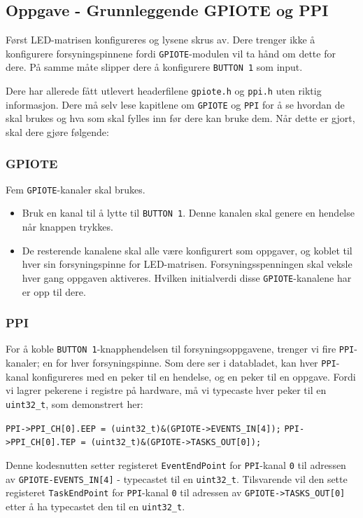 \subsection{Oppgave - Grunnleggende GPIOTE og PPI}
Først LED-matrisen konfigureres og lysene skrus av. Dere trenger ikke å konfigurere forsyningspinnene fordi \verb|GPIOTE|-modulen vil ta hånd om dette for dere. På samme måte slipper dere å konfigurere \verb|BUTTON 1| som input.

Dere har allerede fått utlevert headerfilene \verb|gpiote.h| og \verb|ppi.h| uten riktig informasjon. Dere må selv lese kapitlene om \verb|GPIOTE| og \verb|PPI| for å se hvordan de skal brukes og hva som skal fylles inn før dere kan bruke dem. Når dette er gjort, skal dere gjøre følgende:

\subsubsection{GPIOTE}

Fem \verb|GPIOTE|-kanaler skal brukes. 

\begin{itemize}
    \item Bruk en kanal til å lytte til \verb|BUTTON 1|. Denne kanalen skal genere en hendelse når knappen trykkes. 
    \item De resterende kanalene skal alle være konfigurert som oppgaver, og koblet til hver sin forsyningspinne for LED-matrisen. Forsyningsspenningen skal veksle hver gang oppgaven aktiveres. Hvilken initialverdi disse \verb|GPIOTE|-kanalene har er opp til dere.
\end{itemize}

\subsubsection{PPI}

For å koble \verb|BUTTON 1|-knapphendelsen til forsyningsoppgavene, trenger vi fire \verb|PPI|-kanaler; en for hver forsyningspinne. Som dere ser i databladet, kan hver \verb|PPI|-kanal konfigureres med en peker til en hendelse, og en peker til en oppgave. Fordi vi lagrer pekerene i registre på hardware, må vi typecaste hver peker til en \texttt{uint32\_t}, som demonstrert her:

\verb|PPI->PPI_CH[0].EEP = (uint32_t)&(GPIOTE->EVENTS_IN[4]);|\newline
\verb|PPI->PPI_CH[0].TEP = (uint32_t)&(GPIOTE->TASKS_OUT[0]);|


Denne kodesnutten setter registeret \verb|EventEndPoint| for \verb|PPI|-kanal \verb|0| til adressen av \verb|GPIOTE-EVENTS_IN[4]| - typecastet til en \verb|uint32_t|. Tilsvarende vil den sette registeret \verb|TaskEndPoint| for \verb|PPI|-kanal \verb|0| til adressen av \verb|GPIOTE->TASKS_OUT[0]| etter å ha typecastet den til en \verb|uint32_t|.


